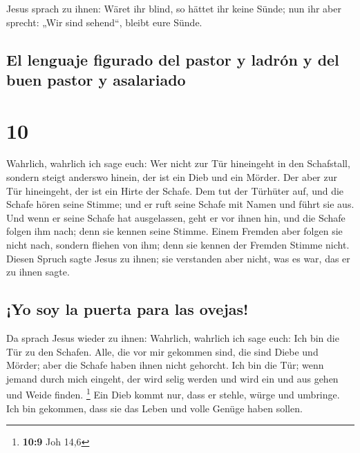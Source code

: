  Jesus sprach zu ihnen: Wäret ihr blind, so hättet ihr
keine Sünde; nun ihr aber sprecht: „Wir sind sehend``, bleibt eure
Sünde.

\hypertarget{el-lenguaje-figurado-del-pastor-y-ladruxf3n-y-del-buen-pastor-y-asalariado}{%
\subsection{El lenguaje figurado del pastor y ladrón y del buen pastor y
asalariado}\label{el-lenguaje-figurado-del-pastor-y-ladruxf3n-y-del-buen-pastor-y-asalariado}}

\hypertarget{section-9}{%
\section{10}\label{section-9}}

 Wahrlich, wahrlich ich sage euch: Wer nicht zur Tür
hineingeht in den Schafstall, sondern steigt anderswo hinein, der ist
ein Dieb und ein Mörder.  Der aber zur Tür hineingeht, der
ist ein Hirte der Schafe.  Dem tut der Türhüter auf, und
die Schafe hören seine Stimme; und er ruft seine Schafe mit Namen und
führt sie aus.  Und wenn er seine Schafe hat ausgelassen,
geht er vor ihnen hin, und die Schafe folgen ihm nach; denn sie kennen
seine Stimme.  Einem Fremden aber folgen sie nicht nach,
sondern fliehen von ihm; denn sie kennen der Fremden Stimme nicht.
 Diesen Spruch sagte Jesus zu ihnen; sie verstanden aber
nicht, was es war, das er zu ihnen sagte.

\hypertarget{yo-soy-la-puerta-para-las-ovejas}{%
\subsection{¡Yo soy la puerta para las
ovejas!}\label{yo-soy-la-puerta-para-las-ovejas}}

 Da sprach Jesus wieder zu ihnen: Wahrlich, wahrlich ich
sage euch: Ich bin die Tür zu den Schafen.  Alle, die vor
mir gekommen sind, die sind Diebe und Mörder; aber die Schafe haben
ihnen nicht gehorcht.  Ich bin die Tür; wenn jemand durch
mich eingeht, der wird selig werden und wird ein und aus gehen und Weide
finden. \footnote{\textbf{10:9} Joh 14,6}  Ein Dieb kommt
nur, dass er stehle, würge und umbringe. Ich bin gekommen, dass sie das
Leben und volle Genüge haben sollen.

